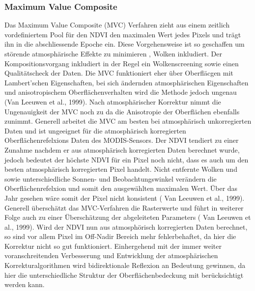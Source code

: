 \documentclass[11pt]{report}
\begin{document}
\subsubsection{Maximum Value Composite}
Das Maximum Value Composite (MVC) Verfahren zieht aus einem zeitlich vordefiniertem Pool für den NDVI den maximalen Wert jedes Pixels und trägt ihn in die abschliessende Epoche ein. Diese Vorgehensweise ist so geschaffen um störende  atmosphärische Effekte zu minimieren , Wolken inkludiert. Der Kompositionsvorgang inkludiert in der Regel ein Wolkenscreening sowie einen Qualitätscheck der Daten. Die MVC funktioniert eher über Oberfläcgen mit Lambert'schen Eigenschaften, bei sich ändernden atmosphärischen Eigenschaften und anisotropischem Oberflächenverhalten wird die Methode jedoch ungenau (Van Leeuwen et al., 1999). Nach atmosphärischer Korrektur nimmt die Ungenauigkeit der MVC noch zu da die Anisotropie der Oberflächen ebenfalls zunimmt. Generell arbeitet die  MVC am besten bei atmosphärisch unkorregierten Daten und ist ungeeignet für die atmosphärisch korregierten Oberflächenrefelxions Daten des MODIS-Sensors. Der NDVI tendiert zu einer Zunahme nachdem er aus atmosphärisch korregierten Daten berechnet wurde, jedoch bedeutet der höchste NDVI für ein Pixel noch nicht, dass es auch um den  besten atmosphärisch korregierten Pixel handelt. Nicht entfernte Wolken und sowie unterschiedliche Sonnen- und Beobachtungswinkel verändern die Oberflächenrefelxion und somit den ausgewählten maximalen Wert. Über das Jahr gesehen wäre somit der Pixel nicht konsistent ( Van Leeuwen et al., 1999). Generell überschätzt das MVC-Verfahren die Rasterwerte und führt in weiterer Folge auch zu einer Überschätzung der abgeleiteten Parameters ( Van Leeuwen et al., 1999). Wird der NDVI nun aus atmosphörisch korregierten Daten berechnet, so sind vor allem Pixel im Off-Nadir Bereich mehr fehlerbehaftet, da hier die Korrektur nicht so gut funktioniert.
Einhergehend mit der immer weiter voranschreitenden Verbesserung und  Entwicklung der atmosphärischen Korrekturalgorithmen wird bidirektionale Reflexion an Bedeutung gewinnen, da hier die unterschiedliche Struktur der Oberflächenbedeckung mit berücksichtigt werden kann.\newline
\end{document}
